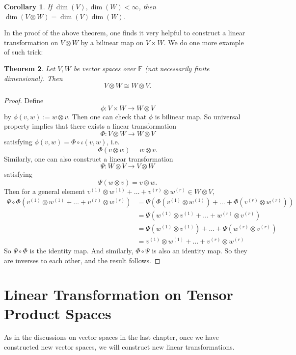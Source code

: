 \documentclass[12pt]{amsbook}
\newtheorem{theorem}{Theorem}[section]
\newtheorem{corollary}[theorem]{Corollary}
\begin{document}
\begin{corollary}
If $\dim(V), \dim(W) < \infty$, then $\dim(V \otimes W) = \dim(V)\dim(W)$.
\end{corollary}

In the proof of the above theorem, one finds it very helpful to construct a linear transformation on $V \otimes W$ by a bilinear map on $V \times W$.
We do one more example of such trick:

\begin{theorem}
    Let $V, W$ be vector spaces over $\mathbb{F}$ (not necessarily finite dimensional). Then 
    $$V \otimes W \cong W \otimes V.$$
\end{theorem}
\begin{proof}
    Define
$$\phi : V \times W \to W \otimes  V$$
by $\phi(v,w) := w \otimes v$. Then one can check that $\phi$ is bilinear map. So universal property implies that there exists a linear transformation
$$ \Phi : V \otimes W \to  W \otimes  V$$
satisfying $\phi(v,w) = \Phi \circ \iota(v,w)$, i.e.
$$\Phi(v \otimes w) = w \otimes v.$$
Similarly, one can also construct a linear transformation $$\Psi: W \otimes V \to V \otimes W$$ satisfying
$$\Psi(w \otimes v) = v \otimes w.$$
Then for a general element $v^{(1)} \otimes w^{(1)} + \dots + v^{(r)} \otimes w^{(r)} \in W \otimes V$,
\begin{align*}
\Psi \circ \Phi(v^{(1)} \otimes w^{(1)}+ \dots + v^{(r)} \otimes w^{(r)})
&= \Psi (\Phi(v^{(1)} \otimes w^{(1)})+ \dots + \Phi(v^{(r)} \otimes w^{(r)})) \\
&= \Psi (w^{(1)} \otimes v^{(1)}+ \dots + w^{(r)} \otimes v^{(r)}) \\
&= \Psi(w^{(1)} \otimes v^{(1)})+ \dots + \Psi(w^{(r)} \otimes v^{(r)}) \\ 
&= v^{(1)} \otimes w^{(1)}+ \dots + v^{(r)} \otimes w^{(r)}
\end{align*}
So $\Psi \circ \Phi$ is the identity map. And similarly, $\Phi \circ \Psi$
is also an identity map. So they are inverses to each other, and the result follows.
\end{proof}

\section{Linear Transformation on Tensor Product Spaces}
As in the discussions on vector spaces in the last chapter, once we have constructed new vector spaces, we will construct new linear transformations.
\end{document}
